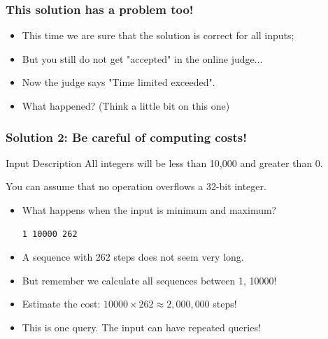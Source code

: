 \begin{frame}
  \frametitle{This solution has a problem too!}
  \begin{itemize}
    \item This time we are sure that the solution is correct for all inputs;
    \item But you still do not get "accepted" in the online judge...
    \bigskip

    \item Now the judge says \alert{"Time limited exceeded"}.
    \bigskip

    \item What happened? (Think a little bit on this one)
  \end{itemize}
\end{frame}

\begin{frame}[fragile]
  \frametitle{Solution 2: Be careful of computing costs!}

    \begin{block}{Input Description}
    All integers will be \alert{less than 10,000 and greater than 0.}
    \bigskip

    You can \alert{assume that no operation overflows a 32-bit integer}.
    \end{block}
    \bigskip

    \begin{itemize}
      \item What happens when the input is \alert{minimum and maximum}?
\begin{verbatim}
1 10000 262
\end{verbatim}
      \bigskip

      \item A sequence with 262 steps does not seem very long.
      \item But remember we calculate \alert{all} sequences between 1, 10000!
      \item Estimate the cost: $10000 \times 262 \approx 2,000,000$ steps!
      \bigskip

      \item This is one query. The input can have repeated queries!
    \end{itemize}
\end{frame}

